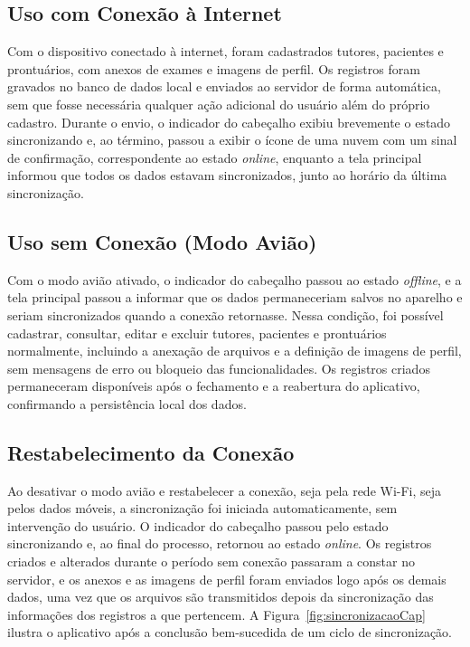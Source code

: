 \subsection{Uso com Conexão à Internet}

Com o dispositivo conectado à internet, foram cadastrados tutores, pacientes e prontuários, com anexos de exames e imagens de perfil. Os registros foram gravados no banco de dados local e enviados ao servidor de forma automática, sem que fosse necessária qualquer ação adicional do usuário além do próprio cadastro. Durante o envio, o indicador do cabeçalho exibiu brevemente o estado sincronizando e, ao término, passou a exibir o ícone de uma nuvem com um sinal de confirmação, correspondente ao estado \textit{online}, enquanto a tela principal informou que todos os dados estavam sincronizados, junto ao horário da última sincronização.

\subsection{Uso sem Conexão (Modo Avião)}

Com o modo avião ativado, o indicador do cabeçalho passou ao estado \textit{offline}, e a tela principal passou a informar que os dados permaneceriam salvos no aparelho e seriam sincronizados quando a conexão retornasse. Nessa condição, foi possível cadastrar, consultar, editar e excluir tutores, pacientes e prontuários normalmente, incluindo a anexação de arquivos e a definição de imagens de perfil, sem mensagens de erro ou bloqueio das funcionalidades. Os registros criados permaneceram disponíveis após o fechamento e a reabertura do aplicativo, confirmando a persistência local dos dados.

\subsection{Restabelecimento da Conexão}

Ao desativar o modo avião e restabelecer a conexão, seja pela rede Wi-Fi, seja pelos dados móveis, a sincronização foi iniciada automaticamente, sem intervenção do usuário. O indicador do cabeçalho passou pelo estado sincronizando e, ao final do processo, retornou ao estado \textit{online}. Os registros criados e alterados durante o período sem conexão passaram a constar no servidor, e os anexos e as imagens de perfil foram enviados logo após os demais dados, uma vez que os arquivos são transmitidos depois da sincronização das informações dos registros a que pertencem. A Figura~\ref{fig:sincronizacaoCap} ilustra o aplicativo após a conclusão bem-sucedida de um ciclo de sincronização.


